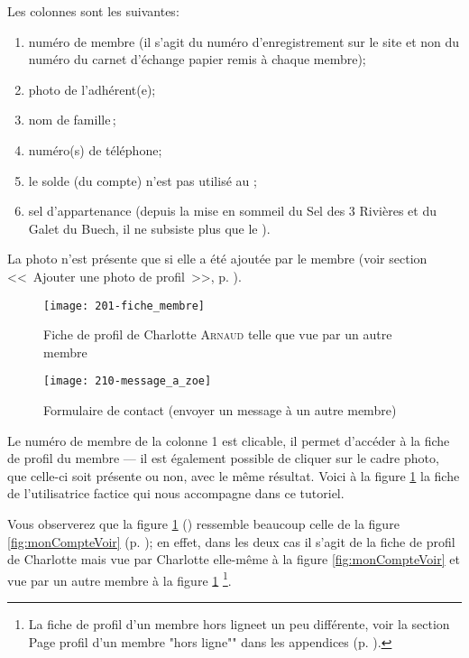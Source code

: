 Les colonnes sont les suivantes: 
\begin{enumerate}
    \item {}numéro de membre (il s’agit du numéro d’enregistrement sur le site et non du numéro du carnet d’échange papier remis à chaque membre);
    \item photo de l’adhérent(e);
    \item nom de famille\,;
    \item numéro(s) de téléphone;
    \item le solde (du compte) n’est pas utilisé au \CdS;
    \item sel d’appartenance (depuis la mise en sommeil du Sel des 3 Rivières et du Galet du Buech, il ne subsiste plus que le \CdS).
\end{enumerate}
La photo n'est présente que si elle a été ajoutée par le membre (voir section <<~Ajouter une photo de profil~>>, p. \pageref{sec:insererImage}).


\label{sec:ficheProfil}

\begin{figure}
    \centering
    \texttt{[image: 201-fiche\_membre]}
    \caption[Fiche de profil de Charlotte \textsc{Arnaud}]{Fiche de profil de Charlotte \textsc{Arnaud} telle que vue par un autre membre}
    \label{fig:ficheMembre}
\end{figure}
\begin{figure}
    \centering
    \texttt{[image: 210-message\_a\_zoe]}
    \caption[Formulaire de contact]{Formulaire de contact (envoyer un message à un autre membre)}
    \label{fig:envoiMessage}
\end{figure}
Le numéro de membre de la colonne 1 est clicable, il permet d’accéder à la fiche de profil du membre --- il est également possible de cliquer sur le cadre photo, que celle-ci soit présente ou non, avec le même résultat. Voici à la figure \ref{fig:ficheMembre} la fiche de l'utilisatrice factice qui nous accompagne dans ce tutoriel.

Vous observerez que la figure \ref{fig:ficheMembre} () ressemble beaucoup celle de la figure \ref{fig:monCompteVoir} (p. \pageref{fig:monCompteVoir}); en effet, dans les deux cas il s'agit de la fiche de profil de Charlotte mais vue par Charlotte elle-même à la figure \ref{fig:monCompteVoir} et vue par un autre membre à la figure \ref{fig:ficheMembre}%
\footnote{La fiche de profil d'un membre \og hors ligne\fg et un peu différente, voir la section \og Page profil d'un membre  "hors ligne"\fg" dans les appendices (p. \pageref{sec:profilMembreHorsLigne}).}.

